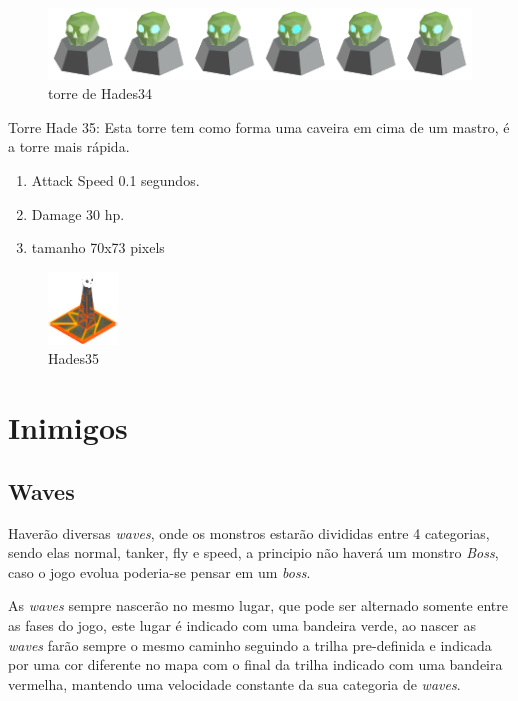 \documentclass[11pt]{article} %
\begin{document}
\begin{figure}[!htp]
\centering
\advance\leftskip-3cm
\advance\rightskip-3cm
\includegraphics[scale=1.3]{res/towers/tower_34.png}
\caption{torre de Hades34}
\end{figure}


Torre Hade 35: Esta torre tem como forma uma caveira em cima de um mastro, é a torre mais rápida.
\begin{enumerate}
\item Attack Speed 0.1 segundos.
\item Damage 30 hp.
\item tamanho 70x73 pixels
\end{enumerate}

\begin{figure}[!htp]
\centering
\includegraphics[scale=1.3]{res/towers/tower_35.png}
\caption{Hades35}
\end{figure}


\section{Inimigos}
\subsection{Waves} 

Haverão diversas \textit{waves}, onde os monstros estarão divididas entre 4 categorias, sendo elas normal, tanker, fly e  speed, a principio não haverá um monstro \textit{Boss}, caso o jogo evolua poderia-se pensar em um \textit{boss}.

As \textit{waves} sempre nascerão no mesmo lugar, que pode ser alternado somente entre as fases do jogo, este lugar é indicado com uma bandeira verde, ao nascer as \textit{waves} farão sempre o mesmo caminho seguindo a trilha pre-definida e indicada por uma cor diferente no mapa com o final da trilha indicado com uma bandeira vermelha, mantendo uma velocidade constante da sua categoria de \textit{waves}. 
\end{document}
